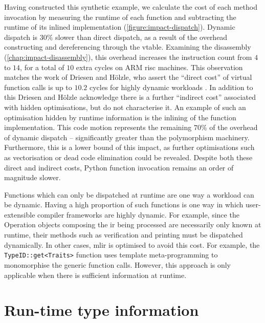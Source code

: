 Having constructed this synthetic example, we calculate the cost of each method invocation by measuring the runtime of each function and subtracting the runtime of its inlined implementation (\autoref{figure:impact-dispatch}).
Dynamic dispatch is $30\%$ slower than direct dispatch, as a result of the overhead constructing and dereferencing through the \ac{vtable}. Examining the disassembly (\autoref{chap:impact-disassembly}), this overhead increases the instruction count from $4$ to $14$, for a total of $10$ extra cycles on ARM \ac{risc} machines. This observation matches the work of Driesen and H\"olzle, who assert the ``direct cost'' of virtual function calls is up to $10.2$ cycles for highly dynamic workloads \cite[Figure 18.]{driesenDirectCostVirtual1996}.
In addition to this Driesen and H\"olzle acknowledge there is a further ``indirect cost'' associated with hidden optimisations, but do not characterise it.
An example of such an optimisation hidden by runtime information is the inlining of the function implementation. This code motion represents the remaining $70\%$ of the overhead of dynamic dispatch -- significantly greater than the polymorphism machinery. Furthermore, this is a lower bound of this impact, as further optimisations such as vectorisation or dead code elimination could be revealed.
Despite both these direct and indirect costs, Python function invocation remains an order of magnitude slower.


Functions which can only be dispatched at runtime are one way a workload can be dynamic.
Having a high proportion of such functions is one way in which user-extensible compiler frameworks are highly dynamic. For example, since the Operation objects composing the \ac{ir} being processed are necessarily only known at runtime, their methods such as verification and printing must be dispatched dynamically.
In other cases, \ac{mlir} is optimised to avoid this cost. For example, the \texttt{TypeID::get<Traits>} function uses template meta-programming to monomorphise the generic function calls. However, this approach is only applicable when there is sufficient information at runtime.




\section{Run-time type information}
\label{sec:dynamism-pattern-rewriting-rtti}

